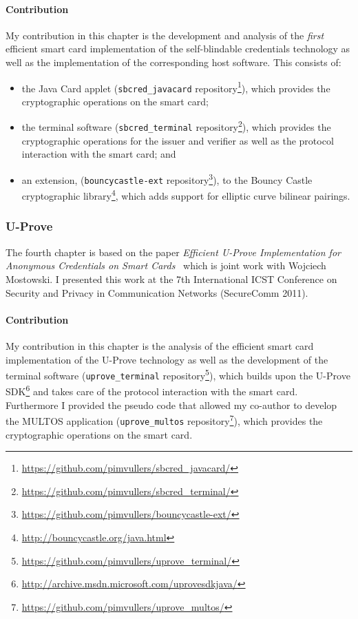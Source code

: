 \paragraph{Contribution}

My contribution in this chapter is the development and analysis of the
\emph{first} efficient smart card implementation of the self-blindable
credentials technology as well as the implementation of the corresponding host
software. This consists of:
\begin{itemize}
  \item the Java Card applet (\texttt{sbcred\_javacard} repository\footnote{%
    \url{https://github.com/pimvullers/sbcred_javacard/}}),
    which provides the cryptographic operations on the smart card;
  \item the terminal software (\texttt{sbcred\_terminal} repository\footnote{%
    \url{https://github.com/pimvullers/sbcred_terminal/}}),
    which provides the cryptographic operations for the issuer and verifier as
    well as the protocol interaction with the smart card; and
  \item an extension, (\texttt{bouncycastle-ext} repository\footnote{%
    \url{https://github.com/pimvullers/bouncycastle-ext/}}),
    to the Bouncy Castle cryptographic library\footnote{%
    \url{http://bouncycastle.org/java.html}}, which adds support for elliptic
    curve bilinear pairings.
\end{itemize}

\subsubsection{U-Prove}

The fourth chapter is based on the paper \emph{Efficient U-Prove Implementation
for Anonymous Credentials on Smart Cards}~\cite{MostowskiVullers11} which is
joint work with Wojciech Mostowski. I presented this work at the 7th
International ICST Conference on Security and Privacy in Communication Networks
(SecureComm 2011).

\paragraph{Contribution}

My contribution in this chapter is the analysis of the efficient smart card
implementation of the U-Prove technology as well as the development of the
terminal software (\texttt{uprove\_terminal} repository\footnote{%
\url{https://github.com/pimvullers/uprove_terminal/}}), which builds upon the
U-Prove SDK\footnote{\url{http://archive.msdn.microsoft.com/uprovesdkjava/}}
and takes care of the protocol interaction with the smart card. Furthermore I
provided the pseudo code that allowed my co-author to develop the MULTOS
application (\texttt{uprove\_multos} repository\footnote{%
\url{https://github.com/pimvullers/uprove_multos/}}), which provides the
cryptographic operations on the smart card.

